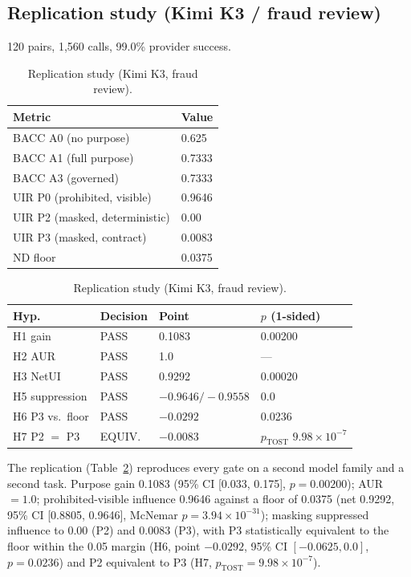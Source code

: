 \subsection{Replication study (Kimi K3 / fraud review)}

120 pairs, 1{,}560 calls, 99.0\% provider success.

\begin{table}[t]
\setlength{\tabcolsep}{3.5pt}
\caption{Replication study (Kimi K3, fraud review).}
\label{tab:replication}
\begin{tabular}{@{}ll@{}}
\toprule
\textbf{Metric} & \textbf{Value} \\
\midrule
BACC A0 (no purpose) & 0.625 \\
BACC A1 (full purpose) & 0.7333 \\
BACC A3 (governed) & 0.7333 \\
UIR P0 (prohibited, visible) & 0.9646 \\
UIR P2 (masked, deterministic) & 0.00 \\
UIR P3 (masked, contract) & 0.0083 \\
ND floor & 0.0375 \\
\bottomrule
\end{tabular}

\medskip
\begin{tabular}{@{}llll@{}}
\toprule
\textbf{Hyp.} & \textbf{Decision} & \textbf{Point} & \textbf{$p$ (1-sided)} \\
\midrule
H1 gain & PASS & 0.1083 & 0.00200 \\
H2 AUR & PASS & 1.0 & --- \\
H3 NetUI & PASS & 0.9292 & 0.00020 \\
H5 suppression & PASS & $-0.9646/-0.9558$ & 0.0 \\
H6 P3 vs.\ floor & PASS & $-0.0292$ & 0.0236 \\
H7 P2 $=$ P3 & EQUIV. & $-0.0083$ & $p_{\mathrm{TOST}}$ $9.98\times10^{-7}$ \\
\bottomrule
\end{tabular}
\end{table}

The replication (Table~\ref{tab:replication}) reproduces every gate on a
second model family and a second task. Purpose gain 0.1083 (95\% CI
[0.033, 0.175], $p = 0.00200$); AUR $= 1.0$; prohibited-visible influence
0.9646 against a floor of 0.0375 (net 0.9292, 95\% CI [0.8805, 0.9646],
McNemar $p = 3.94\times10^{-31}$); masking suppressed influence to 0.00 (P2)
and 0.0083 (P3), with P3 statistically equivalent to the floor within the 0.05
margin (H6, point $-0.0292$, 95\% CI $[-0.0625, 0.0]$, $p = 0.0236$) and P2
equivalent to P3 (H7, $p_{\mathrm{TOST}} = 9.98\times10^{-7}$).

